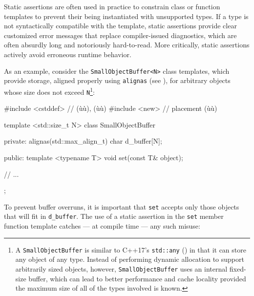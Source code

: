 Static assertions are often used in practice to constrain class or function templates to prevent their being instantiated with unsupported types. If a type is not syntactically compatible with the template, static assertions provide clear customized error messages that replace compiler-issued diagnostics, which are often absurdly long and notoriously hard-to-read. More critically, static assertions actively avoid erroneous runtime behavior.

As an example, consider the \lstinline!SmallObjectBuffer<N>! class
templates, which provide storage, aligned properly using \lstinline!alignas! (see
),
for arbitrary objects whose size does
not exceed \lstinline!N!{\cprotect\footnote{A \lstinline!SmallObjectBuffer! is
  similar to C++17's \lstinline!std::any! (\cite{cpprefstdany}) in
  that it can store any object of any type. Instead of performing
  dynamic allocation to support arbitrarily sized objects, however,
  \lstinline!SmallObjectBuffer! uses an internal fixed-size buffer, which
  can lead to better performance and cache locality provided the
  maximum size of all of the types involved is known.}}:

%
%
\begin{emcppslisting}[emcppsbatch=e3]
#include <cstddef> // (ù{}ù), (ù{}ù)
#include <new>     // placement (ù{}ù)

template <std::size_t N>
class SmallObjectBuffer
{
private:
    alignas(std::max_align_t) char d_buffer[N];

public:
    template <typename T>
    void set(const T& object);

    // ...
};
\end{emcppslisting}


\noindent To prevent buffer overruns, it is important that \lstinline!set! accepts
only those objects that will fit in \lstinline!d_buffer!. The use of a
static assertion in the \lstinline!set! member function template catches
--- at compile time --- any such misuse:

